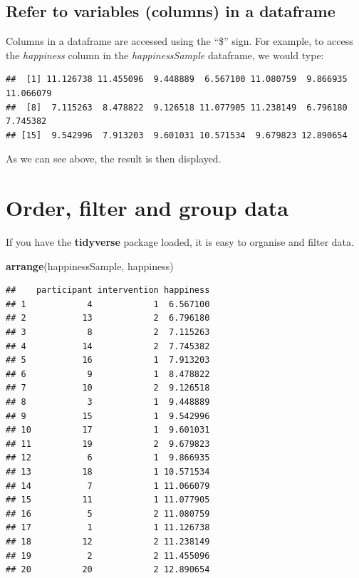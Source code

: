 \documentclass[
]{book}
\newenvironment{Shaded}{\begin{snugshade}}{\end{snugshade}}
\newcommand{\KeywordTok}[1]{\textcolor[rgb]{0.13,0.29,0.53}{\textbf{#1}}}
\newcommand{\NormalTok}[1]{#1}
\newcommand{\OperatorTok}[1]{\textcolor[rgb]{0.81,0.36,0.00}{\textbf{#1}}}
\begin{document}
\hypertarget{refer-to-variables-columns-in-a-dataframe}{%
\subsection{Refer to variables (columns) in a dataframe}\label{refer-to-variables-columns-in-a-dataframe}}

Columns in a dataframe are accessed using the ``\$'' sign. For example, to access the \emph{happiness} column in the \emph{happinessSample} dataframe, we would type:

\begin{Shaded}
\end{Shaded}

\begin{verbatim}
##  [1] 11.126738 11.455096  9.448889  6.567100 11.080759  9.866935 11.066079
##  [8]  7.115263  8.478822  9.126518 11.077905 11.238149  6.796180  7.745382
## [15]  9.542996  7.913203  9.601031 10.571534  9.679823 12.890654
\end{verbatim}

As we can see above, the result is then displayed.

\hypertarget{order-filter-and-group-data}{%
\section{Order, filter and group data}\label{order-filter-and-group-data}}

If you have the \textbf{tidyverse} package loaded, it is easy to organise and filter data.

\begin{Shaded}
\begin{Highlighting}[]
\KeywordTok{arrange}\NormalTok{(happinessSample, happiness)}
\end{Highlighting}
\end{Shaded}

\begin{verbatim}
##    participant intervention happiness
## 1            4            1  6.567100
## 2           13            2  6.796180
## 3            8            2  7.115263
## 4           14            2  7.745382
## 5           16            1  7.913203
## 6            9            1  8.478822
## 7           10            2  9.126518
## 8            3            1  9.448889
## 9           15            1  9.542996
## 10          17            1  9.601031
## 11          19            2  9.679823
## 12           6            1  9.866935
## 13          18            1 10.571534
## 14           7            1 11.066079
## 15          11            1 11.077905
## 16           5            2 11.080759
## 17           1            1 11.126738
## 18          12            2 11.238149
## 19           2            2 11.455096
## 20          20            2 12.890654
\end{verbatim}
\end{document}
